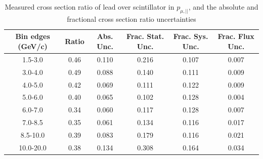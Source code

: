 \documentclass[../main.tex]{subfiles}
\begin{document}
\begin{table}
  \centering
  \renewcommand{\arraystretch}{1.15}
  \caption{Measured cross section ratio of lead over scintillator in $p_{\mu,||}$, and the absolute and fractional cross section ratio uncertainties}
    \begin{tabular}{c||c|c||c|c|c}
      Bin edges (GeV/c) &  Ratio  &  Abs. Unc.  &  Frac. Stat. Unc.  &  Frac. Sys. Unc.  &  Frac. Flux Unc. \\
      \hline
      \hline
      1.5-3.0 & 0.46 & 0.110 & 0.216 & 0.107 & 0.007\\
      3.0-4.0 & 0.49 & 0.088 & 0.140 & 0.111 & 0.009\\
      4.0-5.0 & 0.42 & 0.069 & 0.111 & 0.122 & 0.009\\
      5.0-6.0 & 0.40 & 0.065 & 0.102 & 0.128 & 0.004\\
      6.0-7.0 & 0.34 & 0.060 & 0.117 & 0.128 & 0.007\\
      7.0-8.5 & 0.35 & 0.061 & 0.134 & 0.116 & 0.017\\
      8.5-10.0 & 0.39 & 0.083 & 0.179 & 0.116 & 0.021\\
      10.0-20.0 & 0.38 & 0.134 & 0.308 & 0.164 & 0.034
    \end{tabular}
  \label{tbl:rationucleonnuc82muon_pza}
\end{table}
\begin{table}
  \centering
  \renewcommand{\arraystretch}{1.15}
  \caption{Statistical covariance matrix of measured cross section ratio of lead over scintillator in $p_{\mu,||}$}
  \label{tbl:rationucleonnuc82muon_pzb}
\end{table}
\end{document}
